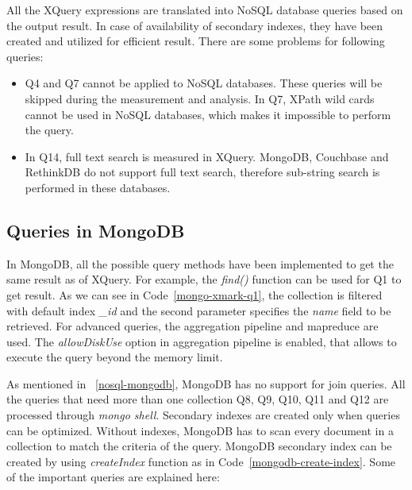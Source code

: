 All the XQuery expressions are translated into NoSQL database queries based on the output result. In case of availability of secondary indexes, they have been created and utilized for efficient result. There are some problems for following queries:
\begin{itemize}
\item Q4 and Q7 cannot be applied to NoSQL databases. These queries will be skipped during the measurement and analysis. In Q7, XPath  wild cards cannot be used in NoSQL databases, which makes it impossible to perform the query. 

\item In Q14, full text search is measured in XQuery. MongoDB, Couchbase and RethinkDB do not support full text search, therefore  sub-string search is performed in these databases. 
\end{itemize}

\subsection{Queries in MongoDB}

In MongoDB, all the possible query methods have been implemented to get the same result as of XQuery.  For example, the \textit{find()} function can be used for Q1 to get result. As we can see in  Code~\ref{mongo-xmark-q1}, the collection is filtered with default index \textit{\_id}  and the second parameter specifies the \textit{name} field to be retrieved.  For advanced queries, the aggregation pipeline and mapreduce are used.   The \textit{allowDiskUse} option in aggregation pipeline is enabled, that allows to execute the query beyond the memory limit.

As mentioned in ~\ref{nosql-mongodb}, MongoDB has no support for  join queries. All the queries that need more than one collection  Q8, Q9, Q10, Q11 and Q12  are processed through \textit{mongo shell}. Secondary indexes are created only when queries can be optimized. Without indexes, MongoDB has to scan every document in a collection to match the criteria of the query. MongoDB secondary index can be created by using \textit{createIndex} function as in Code~\ref{mongodb-create-index}. Some of the important queries are explained here:

